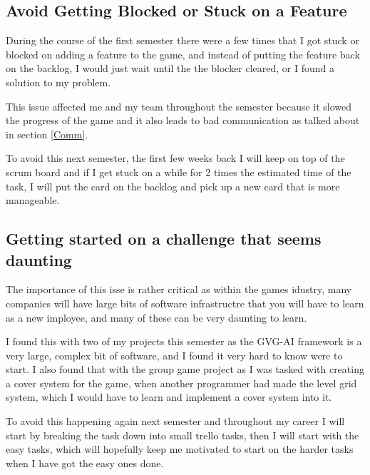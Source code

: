 \documentclass{scrartcl}
\begin{document}
\subsection{Avoid Getting Blocked or Stuck on a Feature} \label{Avoid}

During the course of the first semester there were a few times that I got stuck or blocked on adding a feature to the game, and instead of putting the feature back on the backlog, I would just wait until the the blocker cleared, or I found a solution to my problem.



This issue affected me and my team throughout the semester because it slowed the progress of the game and it also leads to bad communication as talked about in section \ref{Comm}.


To avoid this next semester, the first few weeks back I will keep on top of the scrum board and if I get stuck on a while for 2 times the estimated time of the task, I will put the card on the backlog and pick up a new card that is more manageable.

\par



\subsection{Getting started on a challenge that seems daunting}
The importance of this isse is rather critical as within the games idustry, many companies will have large bits of software infrastructre that you will have to learn as a new imployee, and many of these can be very daunting to learn.

 I found this with two of my projects this semester as the GVG-AI framework is a very large, complex bit of software, and I found it very hard to know were to start. I also found that with the group game project as I was tasked with creating a cover system for the game, when another programmer had made the level grid system, which I would have to learn and implement a cover system into it.

To avoid this happening again next semester and throughout my career I will start by breaking the task down into small trello tasks, then I will start with the easy tasks, which will hopefully keep me motivated to start on the harder tasks when I have got the easy ones done.
\end{document}
